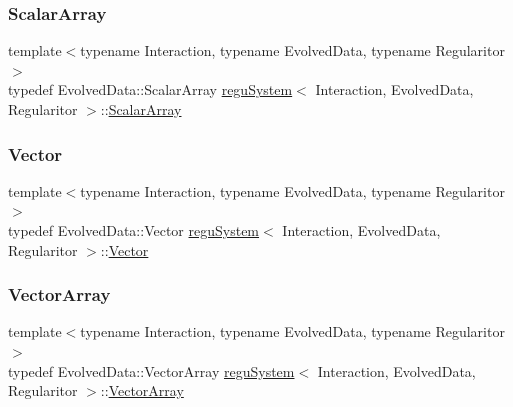 \mbox{\label{classregu_system_a90aade4ee474e3c49df3551515d5e7ef}} 
\subsubsection{\texorpdfstring{Scalar\+Array}{ScalarArray}}
{\footnotesize\ttfamily template$<$typename Interaction, typename Evolved\+Data, typename Regularitor$>$ \\
typedef Evolved\+Data\+::\+Scalar\+Array \mbox{\hyperlink{classregu_system}{regu\+System}}$<$ Interaction, Evolved\+Data, Regularitor $>$\+::\mbox{\hyperlink{classregu_system_a90aade4ee474e3c49df3551515d5e7ef}{Scalar\+Array}}}

\mbox{\label{classregu_system_a809e01e54818f87ef4cdd47953db9e7d}} 
\subsubsection{\texorpdfstring{Vector}{Vector}}
{\footnotesize\ttfamily template$<$typename Interaction, typename Evolved\+Data, typename Regularitor$>$ \\
typedef Evolved\+Data\+::\+Vector \mbox{\hyperlink{classregu_system}{regu\+System}}$<$ Interaction, Evolved\+Data, Regularitor $>$\+::\mbox{\hyperlink{classregu_system_a809e01e54818f87ef4cdd47953db9e7d}{Vector}}}

\mbox{\label{classregu_system_aa4ecefb5c437230b994171e231450be8}} 
\subsubsection{\texorpdfstring{Vector\+Array}{VectorArray}}
{\footnotesize\ttfamily template$<$typename Interaction, typename Evolved\+Data, typename Regularitor$>$ \\
typedef Evolved\+Data\+::\+Vector\+Array \mbox{\hyperlink{classregu_system}{regu\+System}}$<$ Interaction, Evolved\+Data, Regularitor $>$\+::\mbox{\hyperlink{classregu_system_aa4ecefb5c437230b994171e231450be8}{Vector\+Array}}}



